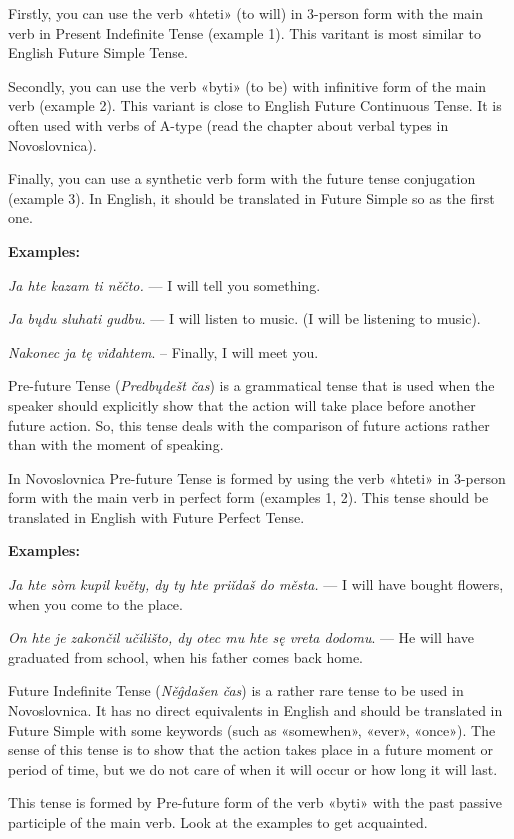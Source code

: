 Firstly, you can use the verb «hteti» (to will) in 3-person form with the main verb in Present Indefinite Tense (example 1). This varitant is most similar to English Future Simple Tense.

Secondly, you can use the verb «byti» (to be) with infinitive form of the main verb (example 2). This variant is close to English Future Continuous Tense. It is often used with verbs of A-type (read the chapter about verbal types in Novoslovnica).

Finally, you can use a synthetic verb form with the future tense conjugation (example 3). In English, it should be translated in Future Simple so as the first one.

\textbf{Examples:}

\textit{Ja hte kazam ti něčto.} — I will tell you something.

\textit{Ja bųdu sluhati gudbu.} — I will listen to music. (I will be listening to music).

\textit{Nakonec ja tę viđahtem}. – Finally, I will meet you.

Pre-future Tense (\textit{Predbųdešt čas}) is a grammatical tense that is used when the speaker should explicitly show that the action will take place before another future action. So, this tense deals with the comparison of future actions rather than with the moment of speaking.

In Novoslovnica Pre-future Tense is formed by using the verb «hteti» in 3-person form with the main verb in perfect form (examples 1, 2). This tense should be translated in English with Future Perfect Tense.

\textbf{Examples:}

\textit{Ja hte sòm kupil květy, dy ty hte priǐdaš do města.} — I will have bought flowers, when you come to the place.

\textit{On hte je zakončil učilišto, dy otec mu hte sę vreta dodomu}. — He will have graduated from school, when his father comes back home.

Future Indefinite Tense (\textit{Něĝdašen čas}) is a rather rare tense to be used in Novoslovnica. It has no direct equivalents in English and should be translated in Future Simple with some keywords (such as «somewhen», «ever», «once»). The sense of this tense is to show that the action takes place in a future moment or period of time, but we do not care of when it will occur or how long it will last.

This tense is formed by Pre-future form of the verb «byti» with the past passive participle of the main verb. Look at the examples to get acquainted.

